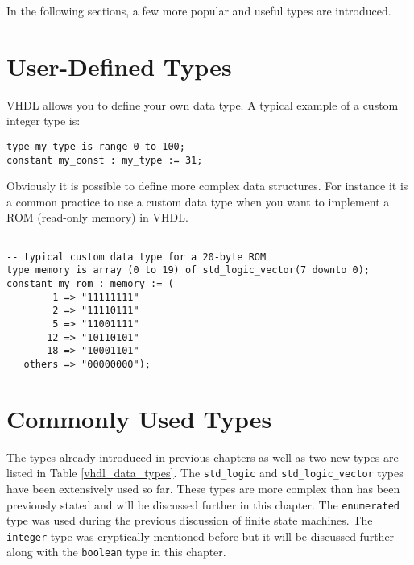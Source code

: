 In the following sections, a few more popular and useful types are introduced.

\section{User-Defined Types}
VHDL allows you to define your own data type. A typical example of a custom integer type is:

\noindent
\texttt{type my\_type is range 0 to 100;}\\
\texttt{constant my\_const : my\_type := 31;}

\noindent
Obviously it is possible to define more complex data structures. For instance it is a common practice to use a custom data type when you want to implement a ROM (read-only memory) in VHDL.

\noindent
\begin{minipage}{0.99\linewidth}
\begin{lstlisting}

-- typical custom data type for a 20-byte ROM
type memory is array (0 to 19) of std_logic_vector(7 downto 0);
constant my_rom : memory := (
        1 => "11111111"
        2 => "11110111"
        5 => "11001111"
       12 => "10110101"
       18 => "10001101"
   others => "00000000");
\end{lstlisting}
\end{minipage}

\section{Commonly Used Types}
The types already introduced in previous chapters as well as two new types are listed in Table \ref{vhdl_data_types}. The \texttt{std\_logic} and \texttt{std\_logic\_vector} types have been extensively used so far. These types are more complex than has been previously stated and will be discussed further in this chapter. The \texttt{enumerated} type was used during the previous discussion of finite state machines. The \texttt{integer} type was cryptically mentioned before but it will be discussed further along with the \texttt{boolean} type in this chapter.

